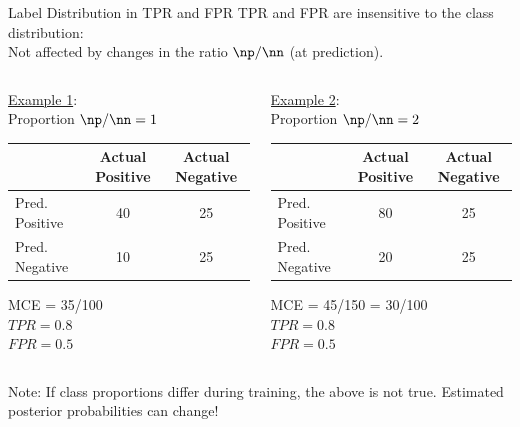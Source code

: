 \documentclass[11pt,compress,t,notes=noshow, xcolor=table]{beamer}
\begin{document}
\begin{vbframe}{Label Distribution in TPR and FPR}
TPR and FPR are insensitive to the class distribution:\\
Not affected by changes in the ratio $\np/\nn$ (at prediction).\\

\begin{columns}
\begin{column}{0.45\textwidth}

\underline{Example 1}:\\
Proportion $\np/\nn = 1$\\

\lz

{
\tiny
\centering
\tiny
\begin{tabular}{|l|c|c|}
                \hline
               & Actual Positive & Actual Negative \\ \hline
Pred. Positive & 40            & 25            \\ \hline
Pred. Negative & 10            & 25           \\ \hline
\end{tabular}
}
 
\lz 

MCE = 35/100\\
$TPR = 0.8$\\ 
$FPR = 0.5$ 

\end{column}
\begin{column}{0.45\textwidth} 

\underline{Example 2}:\\
Proportion $\np/\nn = 2$\\

\lz

{
\tiny
\begin{tabular}{|l|c|c|}
                \hline
               & Actual Positive & Actual Negative \\ \hline
Pred. Positive & 80            & 25            \\ \hline
Pred. Negative & 20            & 25           \\ \hline
\end{tabular}
}
 
\lz 
 
MCE = 45/150 = 30/100\\
$TPR = 0.8$\\ 
$FPR = 0.5$ 
\end{column}
\end{columns}



\lz

Note: If class proportions differ during training, the above is not true. Estimated posterior probabilities can change!

\end{vbframe}
\end{document}
